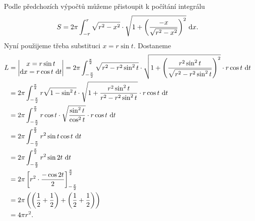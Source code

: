 \begin{reseni}
Podle předchozích výpočtů můžeme přistoupit k počítání integrálu
$$
S=2\pi\int_{-r}^r \sqrt{r^2-x^2}\cdot \sqrt{1+\left ( \frac{-x}{\sqrt{r^2-x^2} } \right )^2 } \, \mathop{}\!\mathrm{d} x.
$$
Nyní použijeme třeba substituci $x=r\sin t$. Dostaneme
\begin{align*}
L &= \begin{vmatrix}
	x=r\sin t \\
	\mathop{}\!\mathrm{d} x = r \cos t \, \mathop{}\!\mathrm{d} t
\end{vmatrix} = 2 \pi \int _{-\frac{\pi }{2}}^{\frac{\pi }{2}} \sqrt{r^2-r^2 \sin^2 t} \cdot \sqrt{1 + \left( \frac{r^2 \sin^2 t }{\sqrt{r^2 - r^2 \sin^2 t}} \right )^2 } \cdot r \cos t \, \mathop{}\!\mathrm{d} t \\
&=2 \pi \int _{-\frac{\pi }{2}}^{\frac{\pi }{2}}r \sqrt{1 - \sin^2 t} \cdot \sqrt{1 + \frac{r^2 \sin^2 t}{r^2-r^2\sin^2 t}}\cdot r \cos t \, \mathop{}\!\mathrm{d} t \\
&= 2 \pi \int _{-\frac{\pi }{2}}^{\frac{\pi }{2}} r \cos t \cdot \sqrt{\frac{\sin^2 t}{\cos^2 t}} \cdot r \cos t \, \mathop{}\!\mathrm{d} t \\
&= 2 \pi \int _{-\frac{\pi }{2}}^{\frac{\pi }{2}}r^2 \sin t \cos t \, \mathop{}\!\mathrm{d} t \\
&= 2 \pi \int _{-\frac{\pi }{2}}^{\frac{\pi }{2}}r^2 \sin 2 t \, \mathop{}\!\mathrm{d} t \\
&= 2 \pi \left [ r^2 \cdot \frac{-\cos 2 t}{2} \right ]_{-\frac{\pi }{2}}^\frac{\pi }{2} \\
&= 2 \pi \left( \left( \frac{1}{2}+\frac{1}{2} \right ) + \left( \frac{1}{2} + \frac{1}{2} \right )   \right ) \\
&= 4\pi r^2.
\end{align*}
\end{reseni}
